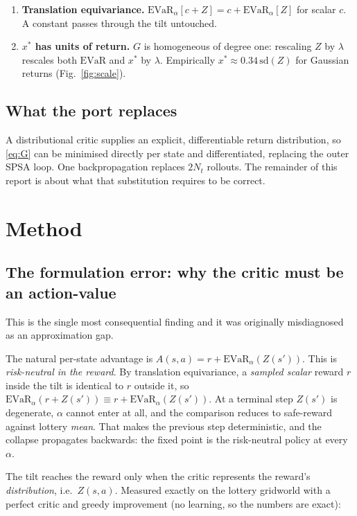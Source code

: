 \documentclass[11pt,a4paper]{article}
\newcommand{\evar}{\mathrm{EVaR}}
\begin{document}
\begin{enumerate}[leftmargin=1.4em,itemsep=0.25em]
\item \textbf{Translation equivariance.} $\evar_\alpha[c + Z] = c + \evar_\alpha[Z]$
      for scalar $c$. A constant passes through the tilt untouched.
\item \textbf{$x^\ast$ has units of return.} $G$ is homogeneous of degree one:
      rescaling $Z$ by $\lambda$ rescales both $\evar$ and $x^\ast$ by $\lambda$.
      Empirically $x^\ast \approx 0.34\,\mathrm{sd}(Z)$ for Gaussian returns
      (Fig.~\ref{fig:scale}).
\end{enumerate}

\subsection{What the port replaces}

A distributional critic supplies an explicit, differentiable return distribution,
so \eqref{eq:G} can be minimised directly per state and differentiated, replacing
the outer SPSA loop. One backpropagation replaces $2N_t$ rollouts. The remainder of
this report is about what that substitution requires to be correct.

\section{Method}

\subsection{The formulation error: why the critic must be an action-value}

This is the single most consequential finding and it was originally misdiagnosed as
an approximation gap.

The natural per-state advantage is
$A(s,a) = r + \evar_\alpha(Z(s'))$. This is \emph{risk-neutral in the reward}. By
translation equivariance, a \emph{sampled scalar} reward $r$ inside the tilt is
identical to $r$ outside it, so $\evar_\alpha(r + Z(s')) \equiv r +
\evar_\alpha(Z(s'))$. At a terminal step $Z(s')$ is degenerate, $\alpha$ cannot
enter at all, and the comparison reduces to safe-reward against lottery
\emph{mean}. That makes the previous step deterministic, and the collapse
propagates backwards: the fixed point is the risk-neutral policy at every $\alpha$.

The tilt reaches the reward only when the critic represents the reward's
\emph{distribution}, i.e.\ $Z(s,a)$. Measured exactly on the lottery gridworld with
a perfect critic and greedy improvement (no learning, so the numbers are exact):
\end{document}
